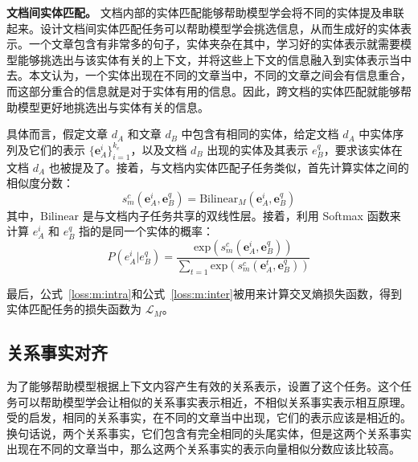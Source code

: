 \smallskip
\noindent
\textbf{文档间实体匹配。} 文档内部的实体匹配能够帮助模型学会将不同的实体提及串联起来。设计文档间实体匹配任务可以帮助模型学会挑选信息，从而生成好的实体表示。一个文章包含有非常多的句子，实体夹杂在其中，学习好的实体表示就需要模型能够挑选出与该实体有关的上下文，并将这些上下文的信息融入到实体表示当中去。本文认为，一个实体出现在不同的文章当中，不同的文章之间会有信息重合，而这部分重合的信息就是对于实体有用的信息。因此，跨文档的实体匹配就能够帮助模型更好地挑选出与实体有关的信息。

具体而言，假定文章 $d_A$ 和文章 $d_B$ 中包含有相同的实体，给定文档 $d_A$ 中实体序列及它们的表示 $\{\mathbf{e}_A^i\}_{i=1}^{k_e}$，以及文档 $d_B$ 出现的实体及其表示 $e_B^q$，要求该实体在文档 $d_A$ 也被提及了。接着，与文档内实体匹配子任务类似，首先计算实体之间的相似度分数：
\begin{equation}
	s_{m}^{c}(\mathbf{e}_A^i, \mathbf{e}_B^q) = \text{Bilinear}_M(\mathbf{e}_A^i, \mathbf{e}_B^q)
\end{equation}
其中，$\text{Bilinear}$ 是与文档内子任务共享的双线性层。接着，利用 Softmax 函数来计算 $e_A^i$ 和 $e_B^q$ 指的是同一个实体的概率：
\begin{equation}
	P(e_A^i | e_B^q) = \frac{\text{exp}(s_m^c(\mathbf{e}_A^i, \mathbf{e}_B^q))}{\sum_{t=1}\text{exp}(s_m^c(\mathbf{e}_A^t, \mathbf{e}_B^q))}
	\label{loss:m:inter}
\end{equation}

\hspace*{\fill}

最后，公式~\ref{loss:m:intra}和公式~\ref{loss:m:inter}被用来计算交叉熵损失函数，得到实体匹配任务的损失函数为 $\mathcal{L}_M$。



\subsection{关系事实对齐}
为了能够帮助模型根据上下文内容产生有效的关系表示，设置了这个任务。这个任务可以帮助模型学会让相似的关系事实表示相近，不相似关系事实表示相互原理。受\citet{soares2019matching}的启发，相同的关系事实，在不同的文章当中出现，它们的表示应该是相近的。换句话说，两个关系事实，它们包含有完全相同的头尾实体，但是这两个关系事实出现在不同的文章当中，那么这两个关系事实的表示向量相似分数应该比较高。

